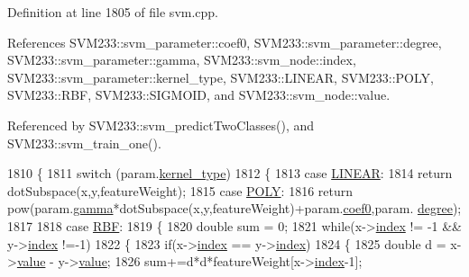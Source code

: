 Definition at line 1805 of file svm.\+cpp.



References S\+V\+M233\+::svm\+\_\+parameter\+::coef0, S\+V\+M233\+::svm\+\_\+parameter\+::degree, S\+V\+M233\+::svm\+\_\+parameter\+::gamma, S\+V\+M233\+::svm\+\_\+node\+::index, S\+V\+M233\+::svm\+\_\+parameter\+::kernel\+\_\+type, S\+V\+M233\+::\+L\+I\+N\+E\+AR, S\+V\+M233\+::\+P\+O\+LY, S\+V\+M233\+::\+R\+BF, S\+V\+M233\+::\+S\+I\+G\+M\+O\+ID, and S\+V\+M233\+::svm\+\_\+node\+::value.



Referenced by S\+V\+M233\+::svm\+\_\+predict\+Two\+Classes(), and S\+V\+M233\+::svm\+\_\+train\+\_\+one().


\begin{DoxyCode}
1810 \{
1811   \textcolor{keywordflow}{switch}  (param.\hyperlink{struct_s_v_m233_1_1svm__parameter_a262be7c9cc8bb14e8bd3476c19eb52dc}{kernel\_type})
1812   \{
1813   \textcolor{keywordflow}{case} \hyperlink{namespace_s_v_m233_a44221c48118ea92c46a316a00e8f9e11a7e5af7f5d7bcd3518975d6f3eb7e117b}{LINEAR}:
1814     \textcolor{keywordflow}{return} dotSubspace(x,y,featureWeight);
1815   \textcolor{keywordflow}{case} \hyperlink{namespace_s_v_m233_a44221c48118ea92c46a316a00e8f9e11a8ba6f8ab5a2dcac5e164e6b0a003ec9d}{POLY}:
1816     \textcolor{keywordflow}{return} pow(param.\hyperlink{struct_s_v_m233_1_1svm__parameter_a39ac3a8cfe2358a6e58ef83ad301019a}{gamma}*dotSubspace(x,y,featureWeight)+param.\hyperlink{struct_s_v_m233_1_1svm__parameter_a50a9e4226133254cd1fd3bd57f8c6331}{coef0},param.
      \hyperlink{struct_s_v_m233_1_1svm__parameter_abb71ffd3ed9223b5239971d18c59f6fe}{degree});
1817 
1818   \textcolor{keywordflow}{case} \hyperlink{namespace_s_v_m233_a44221c48118ea92c46a316a00e8f9e11a0478d3ebef66c527d9acbb734d1959d7}{RBF}:
1819     \{
1820       \textcolor{keywordtype}{double} sum = 0;
1821       \textcolor{keywordflow}{while}(x->\hyperlink{struct_s_v_m233_1_1svm__node_a3c4e097d4f2ba8091128a9b605fcaa12}{index} != -1 && y->\hyperlink{struct_s_v_m233_1_1svm__node_a3c4e097d4f2ba8091128a9b605fcaa12}{index} !=-1)
1822       \{
1823         \textcolor{keywordflow}{if}(x->\hyperlink{struct_s_v_m233_1_1svm__node_a3c4e097d4f2ba8091128a9b605fcaa12}{index} == y->\hyperlink{struct_s_v_m233_1_1svm__node_a3c4e097d4f2ba8091128a9b605fcaa12}{index})
1824         \{
1825           \textcolor{keywordtype}{double} d = x->\hyperlink{struct_s_v_m233_1_1svm__node_abc3f1df2ce88e0759c7f3fe74eefcf0d}{value} - y->\hyperlink{struct_s_v_m233_1_1svm__node_abc3f1df2ce88e0759c7f3fe74eefcf0d}{value};
1826           sum+=d*d*featureWeight[x->\hyperlink{struct_s_v_m233_1_1svm__node_a3c4e097d4f2ba8091128a9b605fcaa12}{index}-1];

\end{DoxyCode}
